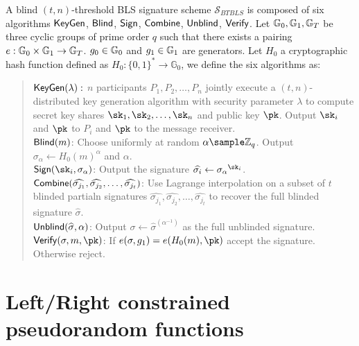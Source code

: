 \begin{definition}\label{def:BTBLS} A blind $(t,n)$-threshold BLS signature scheme $\mathcal{S}_{BTBLS}$ is composed of six algorithms $\mathsf{KeyGen}$, $\mathsf{Blind}$, $\mathsf{Sign}$, $\mathsf{Combine}$, $\mathsf{Unblind}$, $\mathsf{Verify}$. Let $\mathbb{G}_0, \mathbb{G}_1, \mathbb{G}_T$ be three cyclic groups of prime order $q$ such that there exists a pairing $e : \mathbb{G}_0 \times \mathbb{G}_1 \rightarrow \mathbb{G}_T$. $g_0 \in \mathbb{G}_0$ and $g_1 \in \mathbb{G}_1$ are generators. Let $H_0$ a cryptographic hash function defined as $H_0: \{0,1\}^* \rightarrow \mathbb{G}_0$, we define the six algorithms as:
	
	\begin{quote}
		$\mathsf{KeyGen}(\lambda):$ $n$ participants $P_1, P_2, \dots, P_n$ jointly execute a $(t,n)$-distributed key generation algorithm with security parameter $\lambda$ to compute secret key shares $\sk_1, \sk_2, \dots, \sk_n$ and public key $\pk$. Output $\sk_i$ and $\pk$ to $P_i$ and $\pk$ to the message receiver.\\
		$\mathsf{Blind}(m)$: Choose uniformly at random $\alpha \sample \mathbb{Z}_q$. Output $\sigma_\alpha \leftarrow H_0(m)^\alpha$ and $\alpha$. \\
		$\Sign(\sk_i, \sigma_\alpha)$: Output the signature $\widehat{\sigma_i} \leftarrow {\sigma_\alpha}^{\sk_i}$. \\
		$\mathsf{Combine}(\widehat{\sigma_{j_1}}, \widehat{\sigma_{j_2}}, \dots, \widehat{\sigma_{j_t}})$: Use Lagrange interpolation on a subset of $t$ blinded partialn signatures $\widehat{\sigma_{j_1}}, \widehat{\sigma_{j_2}}, \dots, \widehat{\sigma_{j_t}}$ to recover the full blinded signature $\widehat \sigma$. \\
		$\mathsf{Unblind}(\widehat \sigma, \alpha)$: Output $\sigma \leftarrow \widehat \sigma^{(\alpha^{-1})} $ as the full unblinded signature. \\
		$\Verif(\sigma, m, \pk)$: If $e(\sigma, g_1) = e(H_0(m), \pk)$ accept the signature. Otherwise reject.
	\end{quote}
	
\end{definition}




\section{Left/Right constrained pseudorandom functions}

